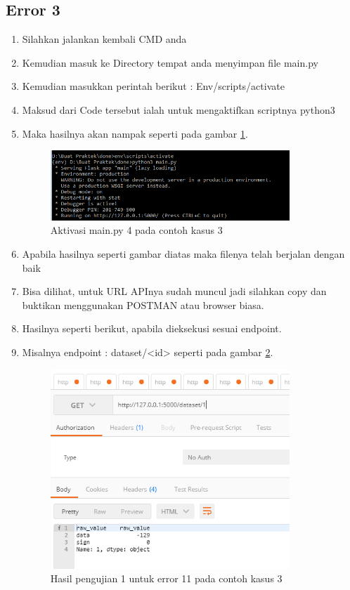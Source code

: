 \subsection{Error 3}
\begin{enumerate}
\item Silahkan jalankan kembali CMD anda
\item Kemudian masuk ke Directory tempat anda menyimpan file main.py
\item Kemudian masukkan perintah berikut : Env/scripts/activate
\item Maksud dari Code tersebut ialah untuk mengaktifkan scriptnya python3
\item Maka hasilnya akan nampak seperti pada gambar \ref{fig:am4}.
\begin{figure}[!htbp]
	\centerline{\includegraphics[width=0.85\textwidth]{figures/10/am4.PNG}}
	\caption{Aktivasi main.py 4 pada contoh kasus 3}
	\label{fig:am4}
\end{figure}

\item Apabila hasilnya seperti gambar diatas maka filenya telah berjalan dengan baik
\item Bisa dilihat, untuk URL APInya sudah muncul jadi silahkan copy dan buktikan menggunakan POSTMAN atau browser biasa.
\item Hasilnya seperti berikut, apabila dieksekusi sesuai endpoint.
 \item Misalnya endpoint : dataset/<id> seperti pada gambar \ref{fig:hu11}.
\begin{figure}[!htbp]
	\centerline{\includegraphics[width=0.85\textwidth]{figures/10/hu11.PNG}}
	\caption{Hasil pengujian 1 untuk error 11 pada contoh kasus 3}
	\label{fig:hu11}
\end{figure}


\end{enumerate}
